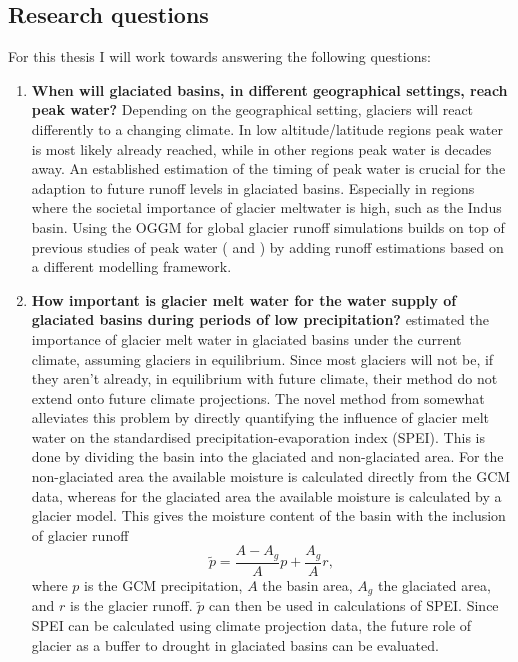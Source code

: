 \documentclass[12pt, a4paper]{article}
\begin{document}
\subsection{Research questions}
For this thesis I will work towards answering the following questions:
\begin{enumerate}
    \item \textbf{When will glaciated basins, in different geographical
    settings, reach peak water?} Depending on the geographical setting, glaciers
    will react differently to a changing climate. In low altitude/latitude
    regions peak water is most likely already reached, while in other regions
    peak water is decades away. An established estimation of the timing of peak
    water is crucial for the adaption to future runoff levels in glaciated
    basins. Especially in regions where the societal importance of glacier
    meltwater is high, such as the Indus basin. Using the OGGM for global
    glacier runoff simulations builds on top of previous studies of peak water
    (\textcite{hussGlobalscaleHydrologicalResponse2018} and
    \textcite{rounceGlacierMassChange2020}) by adding runoff estimations based
    on a different modelling framework.

    \item \textbf{How important is glacier melt water for the water supply of
    glaciated basins during periods of low precipitation?}
    \textcite{kaserContributionPotentialGlaciers2010} estimated the importance
    of glacier melt water in glaciated basins under the current climate,
    assuming glaciers in equilibrium. Since most glaciers will not be, if they
    aren't already, in equilibrium with future climate, their method do not
    extend onto future climate projections. The novel method from \textcite[In
    review]{ulteeGlacialRunoffBuffers2020} somewhat alleviates this problem by
    directly quantifying the influence of glacier melt water on the standardised
    precipitation-evaporation index (SPEI). This is done by dividing the basin
    into the glaciated and non-glaciated area. For the non-glaciated area the
    available moisture is calculated directly from the GCM data, whereas for the
    glaciated area the available moisture is calculated by a glacier model. This
    gives the moisture content of the basin with the inclusion of glacier runoff
    \begin{equation}
        \label{eq:SPEI}
        \tilde{p} = \frac{A - A_g}{A} p + \frac{A_g}{A} r,
    \end{equation}
    where $p$ is the GCM precipitation, $A$ the basin area, $A_g$ the glaciated
    area, and $r$ is the glacier runoff. $\tilde{p}$ can then be used in
    calculations of SPEI. Since SPEI can be calculated using climate projection
    data, the future role of glacier as a buffer to drought in glaciated basins
    can be evaluated. 
    

\end{enumerate}
\end{document}
